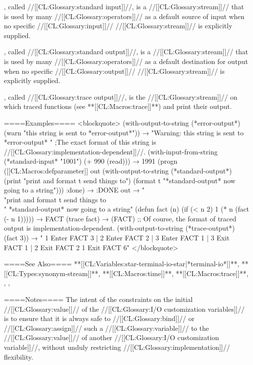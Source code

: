 , called //[[CL:Glossary:standard input]]//, is a //[[CL:Glossary:stream]]// that is used by many //[[CL:Glossary:operators]]// as a default source of input when no specific //[[CL:Glossary:input]]// //[[CL:Glossary:stream]]// is explicitly supplied.


, called //[[CL:Glossary:standard output]]//, is a //[[CL:Glossary:stream]]// that is used by many //[[CL:Glossary:operators]]// as a default destination for output when no specific //[[CL:Glossary:output]]// //[[CL:Glossary:stream]]// is explicitly supplied.

, called //[[CL:Glossary:trace output]]//, is the //[[CL:Glossary:stream]]// on which traced functions (see **[[CL:Macros:trace]]**) and  print their output.

====Examples====
<blockquote> (with-output-to-string (*error-output*) (warn "this string is sent to *error-output*")) → "Warning: this string is sent to *error-output* " ;The exact format of this string is //[[CL:Glossary:implementation-dependent]]//. \medbreak (with-input-from-string (*standard-input* "1001") (+ 990 (read))) → 1991 \medbreak (progn ([[CL:Macros:defparameter]] out (with-output-to-string (*standard-output*) (print "print and format t send things to") (format t "*standard-output* now going to a string"))) :done) → :DONE out → " \\"print and format t send things to\\" *standard-output* now going to a string" \medbreak (defun fact (n) (if (< n 2) 1 (* n (fact (- n 1))))) → FACT (trace fact) → (FACT) ;; Of course, the format of traced output is implementation-dependent. (with-output-to-string (*trace-output*) (fact 3)) → " 1 Enter FACT 3 | 2 Enter FACT 2 | 3 Enter FACT 1 | 3 Exit FACT 1 | 2 Exit FACT 2 1 Exit FACT 6" </blockquote>

====See Also====
**[[CL:Variables:star-terminal-io-star|*terminal-io*]]**, **[[CL:Types:synonym-stream]]**, **[[CL:Macros:time]]**, **[[CL:Macros:trace]]**, {\chapref\Conditions}, {\chapref\Reader}, {\chapref\Printer}

====Notes====
The intent of the constraints on the initial //[[CL:Glossary:value]]// of the //[[CL:Glossary:I/O customization variables]]// is to ensure that it is always safe to //[[CL:Glossary:bind]]// or //[[CL:Glossary:assign]]// such a //[[CL:Glossary:variable]]// to the //[[CL:Glossary:value]]// of another //[[CL:Glossary:I/O customization variable]]//, without unduly restricting //[[CL:Glossary:implementation]]// flexibility.


